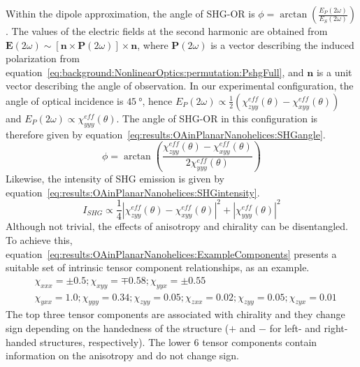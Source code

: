 Within the dipole approximation, the angle of SHG-OR is $\phi=\arctan{\left(\frac{E_P\left(2\omega\right)}{E_S\left(2\omega\right)}\right)}$. 
The values of the electric fields at the second harmonic are obtained from $\mathbf{E}(2\omega)\sim[\mathbf{n}\times\mathbf{P}(2\omega)]\times\mathbf{n}$, where $\mathbf{P}(2\omega)$ is a vector describing the induced polarization from equation~\ref{eq:background:NonlinearOptics:permutation:PshgFull}, and $\mathbf{n}$ is a unit vector describing the angle of observation. 
In our experimental configuration, the angle of optical incidence is $\SI{45}{\degree}$, hence $E_P(2\omega)\propto\frac{1}{2}(\chi_{zyy}^{eff}(\theta)-\chi_{xyy}^{eff}(\theta))$ and $E_P(2\omega)\propto\chi_{yyy}^{eff}(\theta)$. 
The angle of SHG-OR in this configuration is therefore given by equation~\ref{eq:results:OAinPlanarNanohelices:SHGangle}.
\begin{equation}\label{eq:results:OAinPlanarNanohelices:SHGangle}
	\phi  = \arctan \left({\frac{\chi_{zyy}^{eff}(\theta) - \chi _{xyy}^{eff}(\theta)}{2\chi _{yyy}^{eff}(\theta)}}\right)
\end{equation}
Likewise, the intensity of SHG emission is given by equation~\ref{eq:results:OAinPlanarNanohelices:SHGintensity}.
\begin{equation}\label{eq:results:OAinPlanarNanohelices:SHGintensity}
	I_{SHG} \propto \frac{1}{4}{\left| {\chi _{zyy}^{eff}\left( \theta  \right) - \chi _{xyy}^{eff}\left( \theta  \right)} \right|^2} + {\left| {\chi _{yyy}^{eff}\left( \theta  \right)} \right|^2}
\end{equation}
Although not trivial, the effects of anisotropy and chirality can be disentangled. To achieve this, equation~\ref{eq:results:OAinPlanarNanohelices:ExampleComponents} presents a suitable set of intrinsic tensor component relationships, as an example.
\begin{equation}\label{eq:results:OAinPlanarNanohelices:ExampleComponents}
	\begin{split}
		& \chi_{xxx} = \pm 0.5; \chi_{xyy} = \mp0.58; \chi_{yyx} = \pm 0.55 \\
		& \chi _{yxx} = 1.0; \chi _{yyy} = 0.34; \chi _{zyy} = 0.05; \chi _{zxx} = 0.02; \chi_{zyy} = 0.05; \chi _{zyx} = 0.01
	\end{split}
\end{equation}
The top three tensor components are associated with chirality and they change sign depending on the handedness of the structure ($+$ and $-$ for left- and right-handed structures, respectively). 
The lower 6 tensor components contain information on the anisotropy and do not change sign. 
